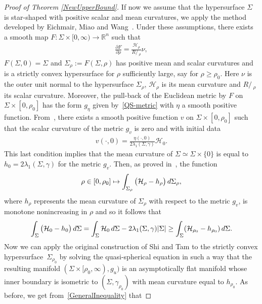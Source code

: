 \documentclass[10pt,a4paper]{article}
\numberwithin{equation}{section}
\theoremstyle{definition}
\def\Ss{R\!\!\!\!/\,}
\begin{document}
\begin{proof}[Proof of Theorem \ref{NewUpperBound}]
If now we assume that the hypersurface $\Sigma$ is star-shaped with positive scalar and mean curvatures, we apply the method developed by Eichmair, Miao and Wang~\cite{EichmairMiaoWang}. Under these assumptions, there exists a smooth map $F\colon\Sigma\times[0,\infty)\rightarrow \mathbb{R}^n$ such that
\begin{gather*}
\frac{\partial F}{\partial \rho}=\frac{\mathcal{H}_\rho}{\Ss_\rho}\nu,
\end{gather*}
$F(\Sigma,0)=\Sigma$ and $\Sigma_\rho:=F(\Sigma,\rho)$ has positive mean and scalar curvatures and is a strictly convex hypersurface for $\rho$ sufficiently large, say for $\rho\geq \rho_0$. Here $\nu$ is the outer unit normal to the hypersurface $\Sigma_\rho$, $\mathcal{H}_\rho$ is its mean curvature and $\Ss_\rho$ its scalar curvature. Moreover, the pull-back of the Euclidean metric by $F$ on $\Sigma\times[0,\rho_0]$ has the form $g_\eta$ given by~\eqref{QS-metric} with $\eta$ a smooth positive function. From~\cite[Proposition 2]{EichmairMiaoWang}, there exists a smooth positive function $v$ on $\Sigma\times [0,\rho_0]$ such that the scalar curvature of the metric $g_v$
is zero and with initial data
\begin{gather*}
v(\cdot,0)=\frac{\eta(\cdot,0)}{2\lambda_1(\Sigma,\gamma)}\mathcal{H}_0.
\end{gather*}
This last condition implies that the mean curvature of $\Sigma\simeq\Sigma\times\{0\}$ is equal to $h_0=2\lambda_1(\Sigma,\gamma)$ for the metric $g_v$.
Then, as proved in~\cite[Proposition~3]{EichmairMiaoWang}, the function
\begin{gather*}
\rho\in[0,\rho_0]\mapsto\int_{\Sigma_\rho}\big(\mathcal{H}_\rho-h_\rho\big)\,{\rm d}\Sigma_\rho,
\end{gather*}
where $h_\rho$ represents the mean curvature of $\Sigma_\rho$ with respect to the metric $g_v$, is monotone nonincreasing in $\rho$ and so it follows that
\begin{gather}\label{Monotone1}
\int_{\Sigma}\big(\mathcal{H}_0-h_0\big)\,{\rm d}\Sigma=\int_{\Sigma}\mathcal{H}_0\,{\rm d}\Sigma-2\lambda_1(\Sigma,\gamma)|\Sigma| \geq \int_{\Sigma}(\mathcal{H}_{\rho_0}-h_{\rho_0})\,{\rm d}\Sigma.
\end{gather}
Now we can apply the original construction of Shi and Tam to the strictly convex hypersurface~$\Sigma_{\rho_0}$ by solving the quasi-spherical equation in such a way that the resulting manifold $(\Sigma\times[\rho_0,\infty),g_u)$ is an asymptotically flat manifold whose inner boundary is isometric to $(\Sigma,\gamma_{\rho_0})$ with mean curvature equal to $h_{\rho_0}$. As before, we get from~\eqref{GeneralInequality} that

\end{proof}
\end{document}
